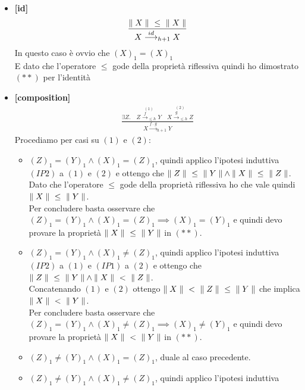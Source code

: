 \begin{itemize}
  \item \textbf{[id]}
    \begin{align*}
        \frac{{\parallel X\parallel}\ \leq\  {\parallel X\parallel}}{X \overset{id}{\longrightarrow}_{h+1} X}
    \end{align*}
      In questo caso è ovvio che $(X)_1 = (X)_1$\\
      E dato che l'operatore $\leq$ gode della proprietà riflessiva quindi ho
      dimostrato $(**)$ per l'identità
  \item \textbf{[composition]}
    \begin{align*}
        \frac{
        \exists Z.
        \quad \overset{(1)}{Z \overset{f}{\longrightarrow}_{\leq h} Y}
        \quad \overset{(2)}{X \overset{g}{\longrightarrow}_{\leq h} Z}
        }{X \overset{f\ .\ g}{\longrightarrow}_{h+1} Y}
    \end{align*}
    Procediamo per casi su $(1)$ e $(2)$:
    \begin{itemize}
      \item $(Z)_1 = (Y)_1 \land (X)_1 = (Z)_1$, quindi applico l'ipotesi induttiva
        $(IP2)$ a $(1)$ e $(2)$ e ottengo che ${\parallel Z\parallel}\ \leq\ {\parallel Y\parallel} \land
        {\parallel X\parallel}\ \leq\ {\parallel Z\parallel}$.\\
        Dato che l'operatore $\leq$ gode della proprietà
        riflessiva ho che vale quindi $\req{X}\ \leq\ \req{Y}$.\\
        Per concludere basta osservare che $(Z)_1 = (Y)_1 \land (X)_1 = (Z)_1
        \implies (X)_1 = (Y)_1$ e quindi devo provare la proprietà $\req{X}\ \leq\ \req{Y}$
        in $(**)$.\\
      \item $(Z)_1 = (Y)_1 \land (X)_1 \neq (Z)_1$, quindi applico l'ipotesi induttiva
        $(IP2)$ a $(1)$ e $(IP1)$ a $(2)$ e ottengo che ${\parallel Z\parallel}\ \leq\ {\parallel Y\parallel} \land
        {\parallel X\parallel}\ <\ {\parallel Z\parallel}$.\\
        Concatenando $(1)$ e $(2)$ ottengo $\req{X}\ <\ \req{Z}\ \leq\ \req{Y}$
        che implica $\req{X}\ <\ \req{Y}$.\\
        Per concludere basta osservare che $(Z)_1 = (Y)_1 \land (X)_1 \neq (Z)_1
        \implies (X)_1 \neq (Y)_1$ e quindi devo provare la proprietà $\req{X}\ <\ \req{Y}$
        in $(**)$.\\
      \item $(Z)_1 \neq (Y)_1 \land (X)_1 = (Z)_1$, duale al caso precedente.\\
      \item $(Z)_1 \neq (Y)_1 \land (X)_1 \neq (Z)_1$, quindi applico l'ipotesi induttiva

\end{itemize}
\end{itemize}
